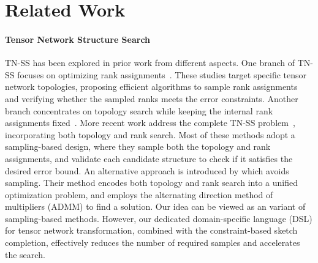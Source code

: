 \section{Related Work}
\label{sec:related}
\paragraph{Tensor Network Structure Search}
%
TN-SS has been explored in prior work from different aspects.
%
One branch of TN-SS focuses on optimizing rank assignments~\cite{pmlr-v32-rai14,mickelin2020algorithms,Sedighin2021Adaptive,Yin_Phan_Zang_Liao_Yuan_2022,pmlr-v202-ghadiri23a}.
%
These studies target specific tensor network topologies, proposing efficient algorithms to sample rank assignments and verifying whether the sampled ranks meets the error constraints.
%
Another branch concentrates on topology search while keeping the internal rank assignments fixed~\cite{hashemizadeh2020adaptive,Li_Sun_2020,PhysRevResearch.5.013031,Haberstich23}.
%
More recent work address the complete TN-SS problem~\cite{Li_Zeng_Tao_Zhao_2022,Li_Zeng_Li_Caiafa_Zhao_2023,zheng2024svdinstn,zengtngps}, incorporating both topology and rank search.
%
Most of these methods adopt a sampling-based design, where they sample both the topology and rank assignments, and validate each candidate structure to check if it satisfies the desired error bound.
%
An alternative approach is introduced by \citet{zheng2024svdinstn} which avoids sampling.
%
Their method encodes both topology and rank search into a unified optimization problem, and employs the alternating direction method of multipliers (ADMM) to find a solution.
%
Our idea can be viewed as an variant of sampling-based methods.
%
However, our dedicated domain-specific language (DSL) for tensor network transformation, combined with the constraint-based sketch completion, effectively reduces the number of required samples and accelerates the search.
%
